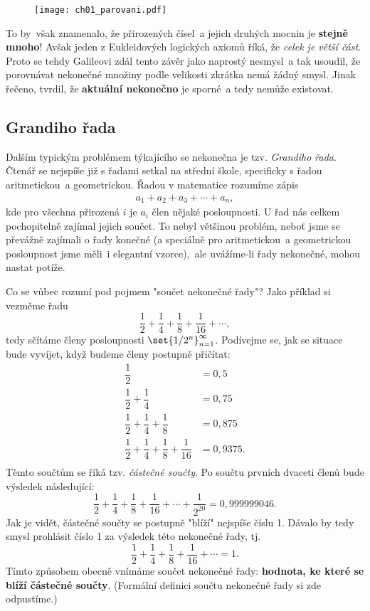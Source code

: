 \begin{figure}[H]
	\centering
	\texttt{[image: ch01\_parovani.pdf]}
\end{figure}

To by~však znamenalo, že přirozených čísel~a jejich druhých mocnin je \textbf{stejně mnoho}! Avšak jeden z Eukleidových logických axiomů říká, že \emph{celek je větší část}. Proto se tehdy Galileovi zdál tento závěr jako naprostý nesmysl~a tak usoudil, že porovnávat nekonečné množiny podle velikosti zkrátka nemá žádný smysl. Jinak řečeno, tvrdil, že \textbf{aktuální nekonečno} je sporné~a tedy nemůže existovat. \cite{Fuchs2003}%

\subsection{Grandiho řada}

Dalším typickým problémem týkajícího se nekonečna je tzv. \emph{Grandiho řada}. Čtenář se nejspíše již s řadami setkal na střední škole, specificky s řadou aritmetickou~a geometrickou. Řadou v matematice rozumíme zápis
\begin{align*}
a_1+a_2+a_3+\cdots+a_n,
\end{align*}
kde pro všechna přirozená $i$ je $a_i$ člen nějaké posloupnosti. U řad nás celkem pochopitelně zajímal jejich součet. To nebyl většinou problém, neboť jsme se převážně zajímali o řady konečné (a speciálně pro aritmetickou~a geometrickou posloupnost jsme měli~i elegantní vzorce),~ale uvážíme-li řady nekonečné, mohou nastat potíže.\par
Co se vůbec rozumí pod pojmem "součet nekonečné řady"? Jako příklad si vezměme řadu
\begin{equation*}
	\dfrac{1}{2}+\dfrac{1}{4}+\dfrac{1}{8}+\dfrac{1}{16}+\cdots,
\end{equation*}
tedy sčítáme členy posloupnosti $\set{1/2^n}_{n=1}^{\infty}$. Podívejme se, jak se situace bude vyvíjet, když budeme členy postupně přičítat:
\begin{align*}
	\dfrac{1}{2}&=0{,}5\\
	\dfrac{1}{2}+\dfrac{1}{4}&=0{,}75\\
	\dfrac{1}{2}+\dfrac{1}{4}+\dfrac{1}{8}&=0{,}875\\
	\dfrac{1}{2}+\dfrac{1}{4}+\dfrac{1}{8}+\dfrac{1}{16}&=0{,}9375.\\
\end{align*}
Těmto součtům se říká tzv. \emph{částečné součty}. Po součtu prvních dvaceti členů bude výsledek následující:
\begin{equation*}
	\dfrac{1}{2}+\dfrac{1}{4}+\dfrac{1}{8}+\dfrac{1}{16}+\cdots+\dfrac{1}{2^{20}}=0{,}999999046.
\end{equation*}
Jak je vidět, částečné součty se postupně "blíží" nejspíše číslu 1. Dávalo by tedy smysl prohlásit číslo 1 za výsledek této nekonečné řady, tj.
\begin{equation*}
	\dfrac{1}{2}+\dfrac{1}{4}+\dfrac{1}{8}+\dfrac{1}{16}+\cdots=1.
\end{equation*}
Tímto způsobem obecně vnímáme součet nekonečné řady: \textbf{hodnota, ke které se blíží částečné součty}. (Formální definici součtu nekonečné řady si zde odpustíme.)
\medskip

